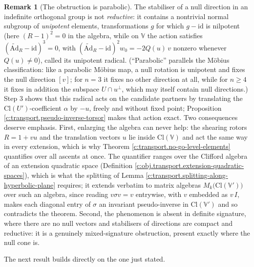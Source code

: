 \documentclass[11pt]{article}
\theoremstyle{definition}
\newtheorem{remark}[theorem]{Remark}
\theoremstyle{plain}
\providecommand{\Ad}{}\renewcommand{\Ad}{\widetilde{\mathrm{Ad}}}
\providecommand{\Cl}{}\renewcommand{\Cl}{\mathrm{Cl}}
\begin{document}
\begin{remark}[The obstruction is parabolic]\label{c:note.transport.obstruction-parabolic}
The stabiliser of a null direction in an indefinite orthogonal group is not \emph{reductive}: it contains a nontrivial normal subgroup of \emph{unipotent} elements, transformations $g$ for which $g - \mathrm{id}$ is nilpotent (here $(R-1)^2 = 0$ in the algebra, while on $\mathbb{V}$ the action satisfies $(\Ad_R - \mathrm{id})^3 = 0$, with $(\Ad_R - \mathrm{id})^2 w_0 = -2Q(u)\,v$ nonzero whenever $Q(u) \neq 0$), called its unipotent radical. (``Parabolic'' parallels the M\"obius classification: like a parabolic M\"obius map, a null rotation is unipotent and fixes the null direction $[v]$; for $n = 3$ it fixes no other direction at all, while for $n \geq 4$ it fixes in addition the subspace $U \cap u^{\perp}$, which may itself contain null directions.) Step 3 shows that this radical acts on the candidate partners by translating the $\Cl(U')$-coefficient $\alpha$ by $-u$, freely and without fixed point; Proposition \ref{c:transport.pseudo-inverse-torsor} makes that action exact. Two consequences deserve emphasis. First, enlarging the algebra can never help: the shearing rotors $R = 1 + vu$ and the translation vectors $u$ lie inside $\Cl(\mathbb{V})$ and act the same way in every extension, which is why Theorem \ref{c:transport.no-go-level-elements} quantifies over all ascents at once. The quantifier ranges over the Clifford algebra of an extension quadratic space (Definition \ref{c:obj.transport.extension-quadratic-spaces}), which is what the splitting of Lemma \ref{c:transport.splitting-along-hyperbolic-plane} requires; it extends verbatim to matrix algebras $M_k\bigl(\Cl(\mathbb{V}')\bigr)$ over such an algebra, since reading $v\sigma v = v$ entrywise, with $v$ embedded as $v\,I$, makes each diagonal entry of $\sigma$ an invariant pseudo-inverse in $\Cl(\mathbb{V}')$ and so contradicts the theorem. Second, the phenomenon is absent in definite signature, where there are no null vectors and stabilisers of directions are compact and reductive: it is a genuinely mixed-signature obstruction, present exactly where the null cone is.
\end{remark}

The next result builds directly on the one just stated.
\end{document}
